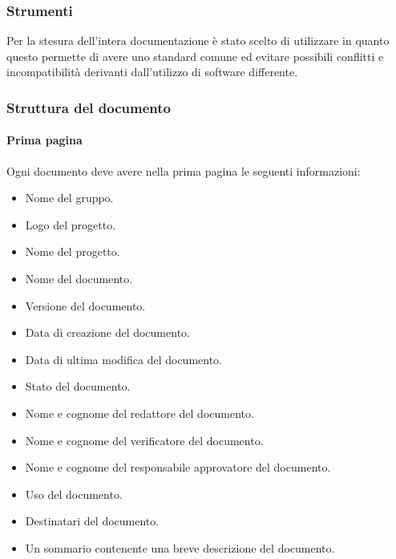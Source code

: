 \subsubsection{Strumenti}
Per la stesura dell'intera documentazione è stato scelto di utilizzare \textit{} in quanto questo  permette di avere uno
standard comune ed evitare possibili conflitti e incompatibilità derivanti
dall'utilizzo di software differente.

\subsubsection{Struttura del documento}
\paragraph{Prima pagina}
Ogni documento deve avere nella prima pagina le seguenti informazioni:
\begin{itemize}
  \item Nome del gruppo.
  \item Logo del progetto.
  \item Nome del progetto.
  \item Nome del documento.
  \item Versione del documento.
  \item Data di creazione del documento.
  \item Data di ultima modifica del documento.
  \item Stato del documento.
  \item Nome e cognome del redattore del documento.
  \item Nome e cognome del verificatore del documento.
  \item Nome e cognome del responsabile approvatore del documento.
  \item Uso del documento.
  \item Destinatari del documento.
  \item Un sommario contenente una breve descrizione del documento.
\end{itemize}

